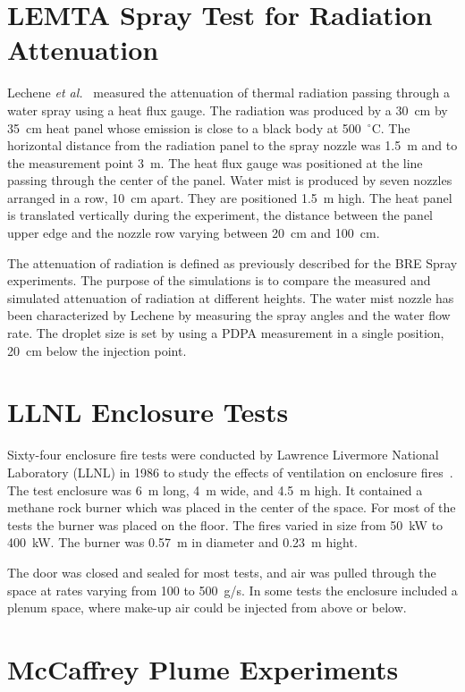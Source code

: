 \section{LEMTA Spray Test for Radiation Attenuation}

Lechene {\em et al.}~\cite{Lechene} measured the attenuation of thermal radiation passing through a water
spray using a heat flux gauge. The radiation was produced by a 30~cm by 35~cm heat panel whose emission is close
to a black body at 500~$^\circ$C. The horizontal distance
from the radiation panel to the spray nozzle was 1.5~m and to the measurement point 3~m. The heat flux gauge was positioned at the line passing through the center of the panel.
Water mist is produced by seven nozzles arranged in a row, 10~cm apart. They are positioned 1.5~m high. The heat panel is translated vertically during the experiment,
the distance between the panel upper edge and the nozzle row varying between 20~cm and 100~cm.

The attenuation of radiation is defined as previously described for the BRE Spray experiments.
The purpose of the simulations is to compare the measured and simulated attenuation of radiation at different heights.
The water mist nozzle has been characterized by Lechene by measuring the spray
angles and the water flow rate. The droplet size is set by using a PDPA measurement in a single position, 20~cm below the injection point.


\section{LLNL Enclosure Tests}

Sixty-four enclosure fire tests were conducted by Lawrence Livermore National Laboratory (LLNL) in 1986 to study the effects of ventilation on enclosure fires~\cite{Foote:LLNL1986}. The test
enclosure was 6~m long, 4~m wide, and 4.5~m high. It contained a methane rock burner which was placed in the center of the space. For most of the tests the burner was placed on the
floor. The fires varied in size from 50~kW to 400~kW. The burner was 0.57~m in diameter and 0.23~m hight.

The door was closed and sealed for most tests, and air was pulled through the space at rates varying from 100 to 500~g/s. In some tests the enclosure included a plenum space, where
make-up air could be injected from above or below.


\section{McCaffrey Plume Experiments}

